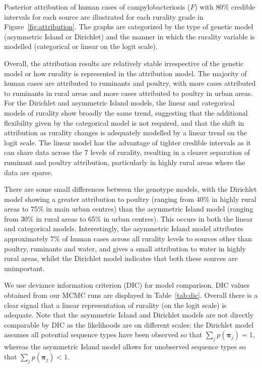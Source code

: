 \documentclass[AMA,STIX1COL]{WileyNJD-v2}
\begin{document}
Posterior attribution of human cases of campylobacteriosis ($F$) with 80\% credible intervals for each source are illustrated for each rurality grade in Figure~\ref{fig:attribution}. The graphs are categorized by the type of genetic model (asymmetric Island or Dirichlet) and the manner in which the rurality variable is modelled (categorical or linear on the logit scale).

Overall, the attribution results are relatively stable irrespective of the genetic model or how rurality is represented in the attribution model. The majority of human cases are attributed to ruminants and poultry, with more cases attributed to ruminants in rural areas and more cases attributed to poultry in urban areas. For the Dirichlet and asymmetric Island models, the linear and categorical models of rurality show broadly the same trend, suggesting that the additional flexibility given by the categorical model is not required, and that the shift in attribution as rurality changes is adequately modelled by a linear trend on the logit scale. The linear model has the advantage of tighter credible intervals as it can share data across the 7 levels of rurality, resulting in a clearer separation of ruminant and poultry attribution, particularly in highly rural areas where the data are sparse.

There are some small differences between the genotype models, with the Dirichlet model showing a greater attribution to poultry (ranging from 40\% in highly rural areas to 75\% in main urban centres) than the asymmetric Island model (ranging from 30\% in rural areas to 65\% in urban centres). This occurs in both the linear and categorical models. Interestingly, the asymmetric Island model attributes approximately 7\% of human cases across all rurality levels to sources other than poultry, ruminants and water, and gives a small attribution to water in highly rural areas, whilst the Dirichlet model indicates that both these sources are unimportant.

We use deviance information criterion (DIC) for model comparison. DIC values obtained from our MCMC runs are displayed in Table~\ref{tab:dic}. Overall there is a clear signal that a linear representation of rurality (on the logit scale) is adequate. Note that the asymmetric Island and Dirichlet models are not directly comparable by DIC as the likelihoods are on different scales: the Dirichlet model assumes all potential sequence types have been observed so that $\sum_j p(\boldsymbol{\pi}_j) = 1$, whereas the asymmetric Island model allows for unobserved sequence types so that $\sum_j p(\boldsymbol{\pi}_j) < 1$.
\end{document}

